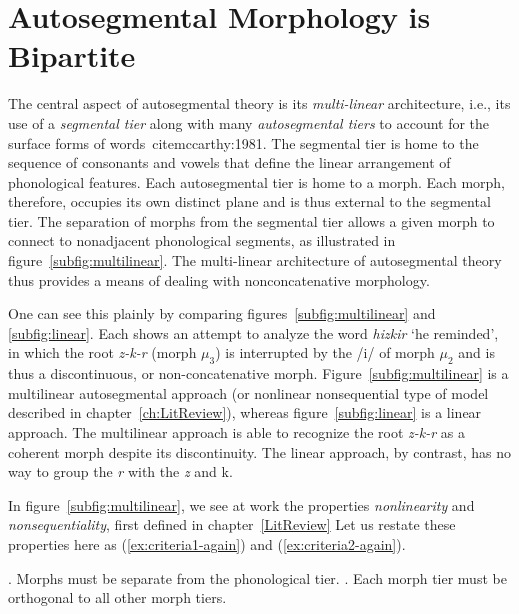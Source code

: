 \section{Autosegmental Morphology is Bipartite}\label{sec:autoseg-bipart}
The central aspect of autosegmental theory 
is its \emph{multi-linear} architecture, i.e., its use of a 
\emph{segmental tier} along with many \emph{autosegmental tiers} to 
account for the surface forms of words\ cite{mccarthy:1981}. The segmental tier is home to the sequence of consonants and vowels that define the linear arrangement of phonological features. Each autosegmental tier is home to a morph. Each morph, therefore, occupies its own distinct plane and is thus external to the segmental tier. The separation of morphs from the segmental tier allows a given morph to connect to nonadjacent phonological segments, as illustrated in figure~\ref{subfig:multilinear}. %
The multi-linear architecture of autosegmental theory thus provides a means of
dealing with nonconcatenative morphology. 

One can see this plainly by comparing figures~\ref{subfig:multilinear} and \ref{subfig:linear}. Each shows an attempt to analyze the word \emph{hizkir} `he reminded', in which the root \textit{z-k-r} (morph $\mu_3$) is interrupted by the /i/ of morph $\mu_2$ and is thus a discontinuous, or non-concatenative morph. Figure~\ref{subfig:multilinear} is a multilinear autosegmental approach (or nonlinear nonsequential type of model described in chapter~\ref{ch:LitReview}), whereas figure~\ref{subfig:linear} is a linear approach. The multilinear approach is able to recognize the root \textit{z-k-r} as a coherent morph despite its discontinuity. The linear approach, by contrast, has no way to group the \textit{r} with the \textit{z} and {k}.

In figure~\ref{subfig:multilinear}, we see at work the properties \emph{nonlinearity} and \emph{nonsequentiality}, first defined in chapter~\ref{LitReview}
Let us restate these properties here as (\ref{ex:criteria1-again}) and (\ref{ex:criteria2-again}).
\begin{exe} \label{ex:criteria-again} \ex \begin{xlist}
	.  %
	Morphs must be separate from the phonological tier. \label{ex:criteria1-again}
	.
	Each morph tier must be orthogonal to all other morph tiers. \label{ex:criteria2-again}
	\end{xlist}
\end{exe}

